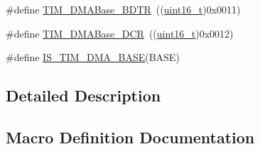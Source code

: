 \begin{DoxyCompactItemize}
\item 
\#define \hyperlink{group___t_i_m___d_m_a___base__address_gaaff22bbf3091c47783c1c68b648c8605}{T\+I\+M\+\_\+\+D\+M\+A\+Base\+\_\+\+B\+D\+TR}~((\hyperlink{_p_e___types_8h_a1f1825b69244eb3ad2c7165ddc99c956}{uint16\+\_\+t})0x0011)
\item 
\#define \hyperlink{group___t_i_m___d_m_a___base__address_ga59e2206e4e03b9d55c9fb5a24e29b01c}{T\+I\+M\+\_\+\+D\+M\+A\+Base\+\_\+\+D\+CR}~((\hyperlink{_p_e___types_8h_a1f1825b69244eb3ad2c7165ddc99c956}{uint16\+\_\+t})0x0012)
\item 
\#define \hyperlink{group___t_i_m___d_m_a___base__address_gaf565551f2619b1368fed7ef1ba7414de}{I\+S\+\_\+\+T\+I\+M\+\_\+\+D\+M\+A\+\_\+\+B\+A\+SE}(B\+A\+SE)
\end{DoxyCompactItemize}


\subsection{Detailed Description}


\subsection{Macro Definition Documentation}
